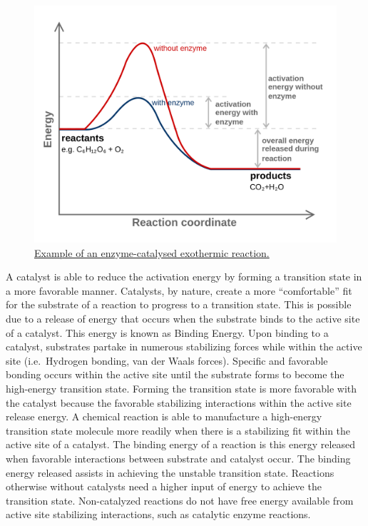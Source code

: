 \begin{figure}

{\centering \includegraphics[width=0.7\linewidth]{./figures/bioenergetics/Activation2_updated} 

}

\caption{\href{https://commons.wikimedia.org/wiki/File:Activation2_updated.svg}{Example of an enzyme-catalysed exothermic reaction.}}\label{fig:activationenergydiagram}
\end{figure}

A catalyst is able to reduce the activation energy by forming a transition state in a more favorable manner. Catalysts, by nature, create a more ``comfortable'' fit for the substrate of a reaction to progress to a transition state. This is possible due to a release of energy that occurs when the substrate binds to the active site of a catalyst. This energy is known as Binding Energy. Upon binding to a catalyst, substrates partake in numerous stabilizing forces while within the active site (i.e.~Hydrogen bonding, van der Waals forces). Specific and favorable bonding occurs within the active site until the substrate forms to become the high-energy transition state. Forming the transition state is more favorable with the catalyst because the favorable stabilizing interactions within the active site release energy. A chemical reaction is able to manufacture a high-energy transition state molecule more readily when there is a stabilizing fit within the active site of a catalyst. The binding energy of a reaction is this energy released when favorable interactions between substrate and catalyst occur. The binding energy released assists in achieving the unstable transition state. Reactions otherwise without catalysts need a higher input of energy to achieve the transition state. Non-catalyzed reactions do not have free energy available from active site stabilizing interactions, such as catalytic enzyme reactions.

